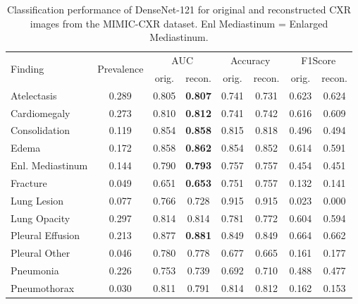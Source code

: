\documentclass{article}
\begin{document}
\begin{table}[]
\caption{Classification performance of  DenseNet-121 for original and reconstructed CXR images from the MIMIC-CXR dataset. Enl Mediastinum = Enlarged Mediastinum.}
\label{mimic-recon-classification}
\centering
\begin{tabular}{@{}lccccccc@{}}
\toprule
\multirow{2}{*}{Finding} & \multirow{2}{*}{Prevalence} & \multicolumn{2}{c}{AUC} & \multicolumn{2}{c}{Accuracy} & \multicolumn{2}{c}{F1Score} \\
                  &                             & orig.   & recon.          & orig.        & recon.        & orig.        & recon.       \\ \midrule
Atelectasis       & 0.289                       & 0.805   & \textbf{0.807}  & 0.741        & 0.731         & 0.623        & 0.624        \\
Cardiomegaly      & 0.273                       & 0.810   & \textbf{0.812}  & 0.741        & 0.742         & 0.616        & 0.609        \\
Consolidation     & 0.119                       & 0.854   & \textbf{0.858}  & 0.815        & 0.818         & 0.496        & 0.494        \\
Edema             & 0.172                       & 0.858   & \textbf{0.862}  & 0.854        & 0.852         & 0.614        & 0.591        \\
Enl. Mediastinum  & 0.144                       & 0.790   & \textbf{0.793}  & 0.757        & 0.757         & 0.454        & 0.451        \\
Fracture          & 0.049                       & 0.651   & \textbf{0.653}  & 0.751        & 0.757         & 0.132        & 0.141        \\
Lung Lesion       & 0.077                       & 0.766   & 0.728           & 0.915        & 0.915         & 0.023        & 0.000        \\
Lung Opacity      & 0.297                       & 0.814   & 0.814           & 0.781        & 0.772         & 0.604        & 0.594        \\
Pleural Effusion  & 0.213                       & 0.877   & \textbf{0.881}  & 0.849        & 0.849         & 0.664        & 0.662        \\
Pleural Other     & 0.046                       & 0.780   & 0.778           & 0.677        & 0.665         & 0.161        & 0.177        \\
Pneumonia         & 0.226                       & 0.753   & 0.739           & 0.692        & 0.710         & 0.488        & 0.477        \\
Pneumothorax      & 0.030                       & 0.811   & 0.791           & 0.814        & 0.812         & 0.162        & 0.153        \\ \bottomrule
\end{tabular}
\end{table}
\end{document}
